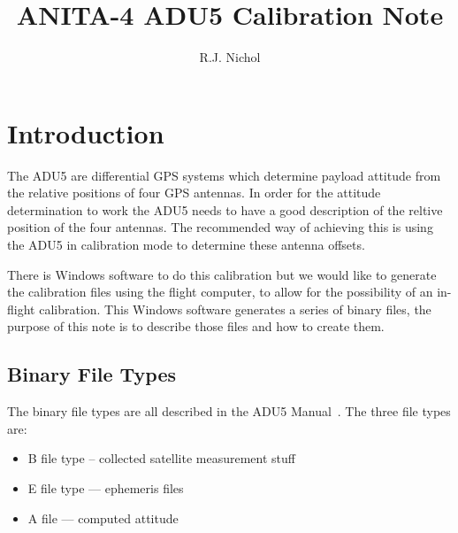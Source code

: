 \documentclass{article}
\begin{document}
\title{ANITA-4 ADU5 Calibration Note}
\author{R.J. Nichol}
  
\maketitle


\section{Introduction}
The ADU5 are differential GPS systems which determine payload attitude from the relative positions of four GPS antennas. In order for the attitude determination to work the ADU5 needs to have a good description of the reltive position of the four antennas. The recommended way of achieving this is using the ADU5 in calibration mode to determine these antenna offsets.

There is Windows software to do this calibration but we would like to generate the calibration files using the flight computer, to allow for the possibility of an in-flight calibration. This Windows software generates a series of binary files, the purpose of this note is to describe those files and how to create them.

\subsection{Binary File Types}
The binary file types are all described in the ADU5 Manual~\cite{ref:adu5Manual}. The three file types are:
\begin{itemize}
\item B file type -- collected satellite measurement stuff
\item E file type — ephemeris files
\item A file — computed attitude
\end{itemize}
\end{document}
